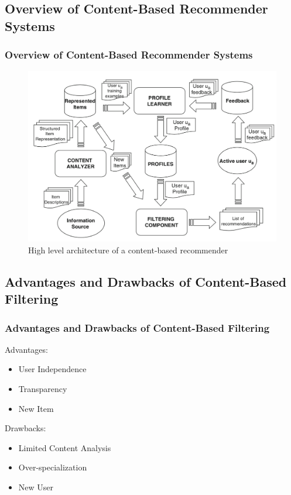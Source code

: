 \documentclass{beamer}
\begin{document}
\subsection{Overview of Content-Based Recommender Systems}
\begin{frame}[plain]
\frametitle{Overview of Content-Based Recommender Systems} 
\begin{figure}
	\includegraphics[scale=0.5]{images/HighLevelContentBased} 
	\caption{High level architecture of a content-based recommender}
\end{figure}
\end{frame}


\subsection{Advantages and Drawbacks of Content-Based Filtering}
\begin{frame} 
\frametitle{Advantages and Drawbacks of Content-Based Filtering} 
Advantages:
\begin{itemize}
	\item User Independence
	\item Transparency
	\item New Item
\end{itemize} 
Drawbacks:
\begin{itemize}
	\item Limited Content Analysis
	\item Over-specialization
	\item New User
\end{itemize} 
\end{frame}
\end{document}
